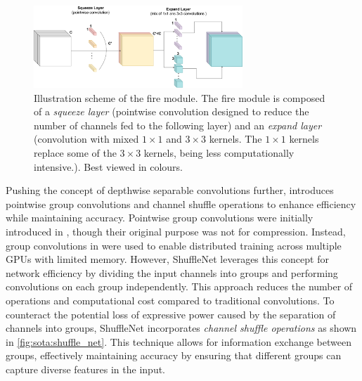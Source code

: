 \begin{figure}[htbp]
    \centering
    \includegraphics[width=0.70\textwidth]{chapter_sota/assets/fire_module.pdf}
    \caption{Illustration scheme of the fire module. The fire module is composed
    of a \emph{squeeze layer} (pointwise convolution designed to reduce the
    number of channels fed to the following layer) and an \emph{expand layer}
    (convolution with mixed $1\times1$ and $3\times3$ kernels. The $1\times1$
    kernels replace some of the $3\times3$ kernels, being less computationally
    intensive.). Best viewed in colours.}
    \label{fig:sota:fire_module}
\end{figure}



Pushing the concept of depthwise separable convolutions further,
\cite{ZhangShuffleNet} introduces pointwise group convolutions and channel
shuffle operations to enhance efficiency while maintaining accuracy. Pointwise
group convolutions were initially introduced in
\cite{DBLP:conf/nips/KrizhevskySH12}, though their original purpose was not for
compression. Instead, group convolutions in \cite{DBLP:conf/nips/KrizhevskySH12}
were used to enable distributed training across multiple \acp{GPU} with limited
memory. However, ShuffleNet \cite{ZhangShuffleNet} leverages this concept for
network efficiency by dividing the input channels into groups and performing
convolutions on each group independently. This approach reduces the number of
operations and computational cost compared to traditional convolutions. To
counteract the potential loss of expressive power caused by the separation of
channels into groups, ShuffleNet incorporates \emph{channel shuffle operations}
as shown in \cref{fig:sota:shuffle_net}. This technique allows for information
exchange between groups, effectively maintaining accuracy by ensuring that
different groups can capture diverse features in the input.\\


